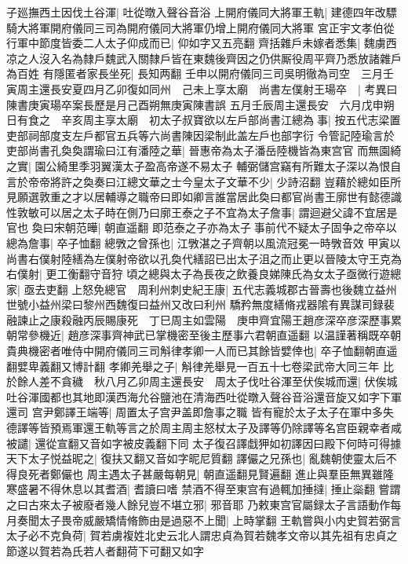 子廵撫西土因伐土谷渾|{
	吐從暾入聲谷音浴}
上開府儀同大將軍王軌|{
	建德四年改驃騎大將軍開府儀同三司為開府儀同大將軍仍增上開府儀同大將軍}
宮正宇文孝伯從行軍中節度皆委二人太子仰成而已|{
	仰如字又五亮翻}
齊括雜戶未嫁者悉集|{
	魏虜西凉之人沒入名為隸戶魏武入關隸戶皆在東魏後齊因之仍供厮役周平齊乃悉放諸雜戶為百姓}
有隱匿者家長坐死|{
	長知两翻}
壬申以開府儀同三司吳明徹為司空　三月壬寅周主還長安夏四月乙卯復如同州　己未上享太廟　尚書左僕射王瑒卒　|{
	考異曰陳書庚寅瑒卒案長歷是月己酉朔無庚寅陳書誤}
五月壬辰周主還長安　六月戊申朔日有食之　辛亥周主享太廟　初太子叔寶欲以左戶部尚書江總為事|{
	按五代志梁置吏部祠部度支左戶都官五兵等六尚書陳因梁制此盖左戶也部字衍}
令管記陸瑜言於吏部尚書孔奐奐謂瑜曰江有潘陸之華|{
	晉惠帝為太子潘岳陸機皆為東宫官}
而無園綺之實|{
	園公綺里季羽翼漢太子盈高帝遂不易太子}
輔弼儲宫竊有所難太子深以為恨自言於帝帝將許之奐奏曰江總文華之士今皇太子文華不少|{
	少詩沼翻}
豈藉於總如臣所見願選敦重之才以居輔導之職帝曰即如卿言誰當居此奐曰都官尚書王廓世有懿德識性敦敏可以居之太子時在側乃曰廓王泰之子不宜為太子詹事|{
	謂迴避父諱不宜居是官也}
奐曰宋朝范曄|{
	朝直遥翻}
即范泰之子亦為太子事前代不疑太子固争之帝卒以總為詹事|{
	卒子恤翻}
總斆之曾孫也|{
	江斆湛之子齊朝以風流冠冕一時斆音效}
甲寅以尚書右僕射陸繕為左僕射帝欲以孔奐代繕詔已出太子沮之而止更以晉陵太守王克為右僕射|{
	更工衡翻守音狩}
頃之總與太子為長夜之飲養良娣陳氏為女太子亟微行遊總家|{
	亟去吏翻}
上怒免總官　周利州刺史紀王康|{
	五代志義城郡古晉壽也後魏立益州世號小益州梁曰黎州西魏復曰益州又改曰利州}
驕矜無度繕脩戎器隂有異謀司録裴融諫止之康殺融丙辰賜康死　丁巳周主如雲陽　庚申齊宜陽王趙彦深卒彦深歷事累朝常參機近|{
	趙彦深事齊神武已掌機密至後主歷事六君朝直遥翻}
以温謹著稱既卒朝貴典機密者唯侍中開府儀同三司斛律孝卿一人而已其餘皆嬖倖也|{
	卒子恤翻朝直遥翻嬖卑義翻又博計翻}
孝卿羌舉之子|{
	斛律羌舉見一百五十七卷梁武帝大同三年}
比於餘人差不貪穢　秋八月乙卯周主還長安　周太子伐吐谷渾至伏俟城而還|{
	伏俟城吐谷渾國都也其地即漢西海允谷鹽池在清海西吐從暾入聲谷音浴還音旋又如字下軍還司}
宫尹鄭譯王端等|{
	周置太子宫尹盖即詹事之職}
皆有寵於太子太子在軍中多失德譯等皆預焉軍還王軌等言之於周主周主怒杖太子及譯等仍除譯等名宫臣親幸者咸被譴|{
	還從宣翻又音如字被皮義翻下同}
太子復召譯戱狎如初譯因曰殿下何時可得據天下太子悦益昵之|{
	復扶又翻又音如字昵尼質翻}
譯儼之兄孫也|{
	亂魏朝使靈太后不得良死者鄭儼也}
周主遇太子甚嚴每朝見|{
	朝直遥翻見賢遍翻}
進止與羣臣無異雖隆寒盛暑不得休息以其耆酒|{
	耆讀曰嗜}
禁酒不得至東宫有過輒加捶撻|{
	捶止橤翻}
嘗謂之曰古來太子被廢者幾人餘兒豈不堪立邪|{
	邪音耶}
乃敕東宫官屬録太子言語動作每月奏聞太子畏帝威嚴矯情脩飾由是過惡不上聞|{
	上時掌翻}
王軌嘗與小内史賀若弼言太子必不克負荷|{
	賀若虜複姓北史云北人謂忠貞為賀若魏孝文帝以其先祖有忠貞之節遂以賀若為氏若人者翻荷下可翻又如字}
